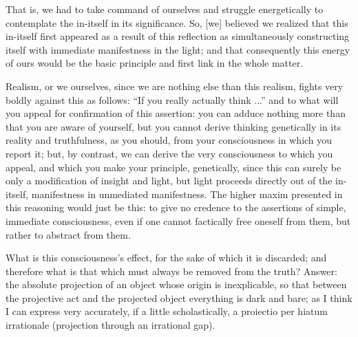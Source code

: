 That is, we had to take command of ourselves
and struggle energetically to contemplate
the in-itself in its significance.
So, [we] believed we realized that this in-itself first appeared
as a result of this reflection as
simultaneously constructing itself with
immediate manifestness in the light;
and that consequently this energy of ours would be
the basic principle and first link in the whole matter.

Realism, or we ourselves, since we are nothing else than this realism,
fights very boldly against this as follows:
“If you really actually think ...”
and to what will you appeal for confirmation of this assertion:
you can adduce nothing more than that you are aware of yourself,
but you cannot derive thinking genetically in its reality and truthfulness,
as you should, from your consciousness in which you report it;
but, by contrast, we can derive the very consciousness to which you appeal,
and which you make your principle, genetically,
since this can surely be only a modification of insight and light,
but light proceeds directly out of the in-itself,
manifestness in unmediated manifestness.
The higher maxim presented in this reasoning would just be this:
to give no credence to the assertions
of simple, immediate consciousness,
even if one cannot factically free oneself from them,
but rather to abstract from them.

What is this consciousness's effect,
for the sake of which it is discarded;
and therefore what is that
which must always be removed from the truth?
Answer:
the absolute projection of an object
whose origin is inexplicable,
so that between the projective act
and the projected object
everything is dark and bare;
as I think I can express very accurately,
if a little scholastically,
a proiectio per hiatum irrationale
(projection through an irrational gap).

